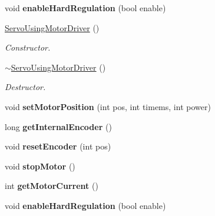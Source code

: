 \begin{DoxyCompactItemize}
void {\bfseries enable\+Hard\+Regulation} (bool enable)
\item 
\mbox{\label{classServoUsingMotorDriver_acc8ccf92143efa853b83940d2d690817}} 
\hyperlink{classServoUsingMotorDriver_acc8ccf92143efa853b83940d2d690817}{Servo\+Using\+Motor\+Driver} ()
\begin{DoxyCompactList}\small\item\em Constructor. \end{DoxyCompactList}\item 
\mbox{\label{classServoUsingMotorDriver_a8aa604a17555514d3ddf78e15f467faf}} 
\hyperlink{classServoUsingMotorDriver_a8aa604a17555514d3ddf78e15f467faf}{$\sim$\+Servo\+Using\+Motor\+Driver} ()
\begin{DoxyCompactList}\small\item\em Destructor. \end{DoxyCompactList}\item 
\mbox{\label{classServoUsingMotorDriver_a9569643c48ac9d6c1936e8562825e280}} 
void {\bfseries set\+Motor\+Position} (int pos, int timems, int power)
\item 
\mbox{\label{classServoUsingMotorDriver_a64c62fd0ecb287fe45770c387e394eac}} 
long {\bfseries get\+Internal\+Encoder} ()
\item 
\mbox{\label{classServoUsingMotorDriver_acf78dbe83df0a7744fd40920a6388efd}} 
void {\bfseries reset\+Encoder} (int pos)
\item 
\mbox{\label{classServoUsingMotorDriver_a58fbf805d7bb382b505ea634e6bcbb08}} 
void {\bfseries stop\+Motor} ()
\item 
\mbox{\label{classServoUsingMotorDriver_ad76b35929d55c4249c5e7c3818c053b6}} 
int {\bfseries get\+Motor\+Current} ()
\item 
\mbox{\label{classServoUsingMotorDriver_adeb6e60d59bac919b7dc45c6f4a4f32c}} 
void {\bfseries enable\+Hard\+Regulation} (bool enable)
\item 
\mbox{\label{classServoUsingMotorDriver_acc8ccf92143efa853b83940d2d690817}} 

\end{DoxyCompactItemize}
